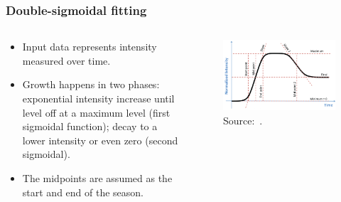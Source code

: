 \documentclass[aspectratio=169]{beamer}
\begin{document}
\begin{frame}
    \frametitle{Double-sigmoidal fitting}
    \begin{columns}
        \begin{column}{0.5\linewidth}
            \begin{itemize}
                \item Input data represents intensity measured over time.
                \item Growth happens in two phases: exponential intensity
                    increase until level off at a maximum level (first
                    sigmoidal function); decay to a lower intensity or even zero
                    (second sigmoidal).
                \item The midpoints are assumed as the start and end of the
                    season.
            \end{itemize}
        \end{column}
        \begin{column}{0.5\linewidth}
            \begin{figure}[h]
                \includegraphics[width=0.99\linewidth]
                {./images/dsig_function.png}
                \caption{Source:~\cite{caglar2018}.}
            \end{figure}
        \end{column}
    \end{columns}
\end{frame}
\end{document}
